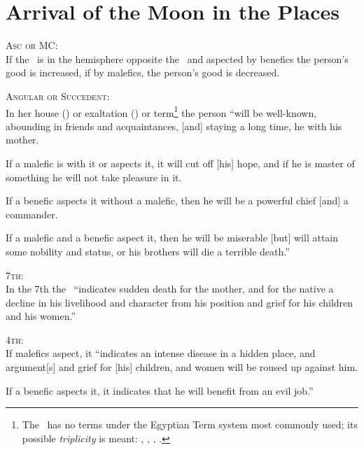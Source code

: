 \section{Arrival of the Moon in the Places}

\textsc{Asc or MC:} \\
\indent If the \Moon\, is in the hemisphere opposite the \Sun\, and aspected by benefics the person's good is increased, if by  malefics, the person's good is decreased.

\noindent\textsc{Angular or Succedent:} \\
\indent In her house (\Cancer) or exaltation (\Taurus) or term\footnote{The \Moon\, has no terms under the Egyptian Term system most commonly used; its possible \textsl{triplicity} is meant: \Virgo, \Scorpio, \Capricorn, \Pisces.} the person ``will be well-known, abounding in friends and acquaintances, [and] staying a long time, he with his mother.

If a malefic is with it or aspects it, it will cut off [his] hope, and if he is master of something he will not take pleasure in it. 

If a benefic aspects it without a malefic, then he will be a powerful chief [and] a commander.

If a malefic and a benefic aspect it, then he will be miserable [but] will attain some nobility and status, or his brothers will die a terrible death.''

\noindent\textsc{7th:} \\
\indent In the 7th the \Moon\, ``indicates sudden death for the mother, and for the native a decline in his livelihood and character from his position and grief for his children and his women.''

\noindent\textsc{4th:} \\
\indent If malefics aspect, it ``indicates an intense disease in a hidden place, and argument[s] and grief for [his] children, and women will be roused up against him.

If a benefic aspects it, it indicates that he will benefit from an evil job.''




